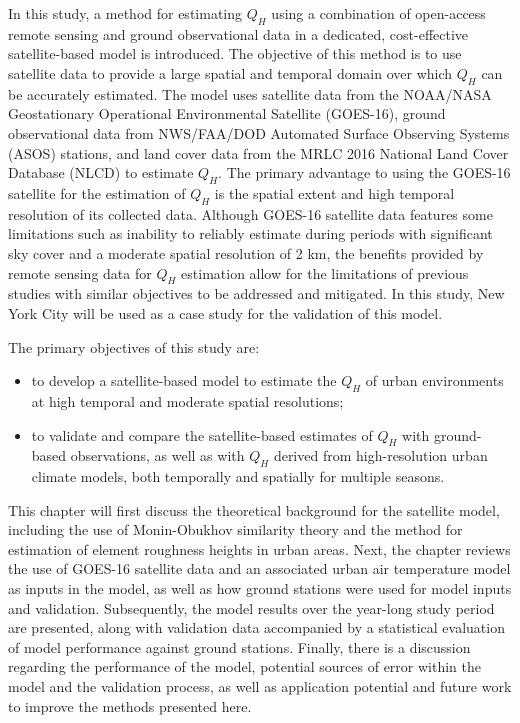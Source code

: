 In this study, a method for estimating $Q_H$ using a combination of open-access remote sensing and ground observational data in a dedicated, cost-effective satellite-based model is introduced. The objective of this method is to use satellite data to provide a large spatial and temporal domain over which $Q_H$ can be accurately estimated. The model uses satellite data from the NOAA/NASA Geostationary Operational Environmental Satellite (GOES-16), ground observational data from NWS/FAA/DOD Automated Surface Observing Systems (ASOS) stations, and land cover data from the MRLC 2016 National Land Cover Database (NLCD) to estimate $Q_H$. 
The primary advantage to using the GOES-16 satellite for the estimation of $Q_H$ is the spatial extent and high temporal resolution of its collected data. Although GOES-16 satellite data features some limitations such as inability to reliably estimate during periods with significant sky cover and a moderate spatial resolution of 2 km, the benefits provided by remote sensing data for $Q_H$ estimation allow for the limitations of previous studies with similar objectives to be addressed and mitigated. In this study, New York City will be used as a case study for the validation of this model.

The primary objectives of this study are:
\begin{itemize}
    \item to develop a satellite-based model to estimate the $Q_H$ of urban environments at high temporal and moderate spatial resolutions;
    \item to validate and compare the satellite-based estimates of $Q_H$ with ground-based observations, as well as with $Q_H$ derived from high-resolution urban climate models, both temporally and spatially for multiple seasons.
\end{itemize}

This chapter will first discuss the theoretical background for the satellite model, including the use of Monin-Obukhov similarity theory \citep{Monin_1954} and the method for estimation of element roughness heights in urban areas. Next, the chapter reviews the use of GOES-16 satellite data and an associated urban air temperature model \citep{Hrisko_2020} as inputs in the model, as well as how ground stations were used for model inputs and validation. Subsequently, the model results over the year-long study period are presented, along with validation data accompanied by a statistical evaluation of model performance against ground stations. Finally, there is a discussion regarding the performance of the model, potential sources of error within the model and the validation process, as well as application potential and future work to improve the methods presented here.

